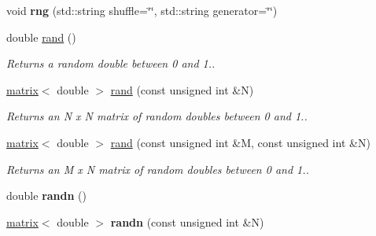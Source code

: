 \begin{DoxyCompactItemize}
\item 
\hypertarget{namespacekeycpp_af2478c69f713d8664b53d31f25718530}{void {\bfseries rng} (std\-::string shuffle=\char`\"{}\char`\"{}, std\-::string generator=\char`\"{}\char`\"{})}\label{namespacekeycpp_af2478c69f713d8664b53d31f25718530}

\item 
\hypertarget{namespacekeycpp_a5ef5c1f5951e8182a7c4ec9612f3f7e1}{double \hyperlink{namespacekeycpp_a5ef5c1f5951e8182a7c4ec9612f3f7e1}{rand} ()}\label{namespacekeycpp_a5ef5c1f5951e8182a7c4ec9612f3f7e1}

\begin{DoxyCompactList}\small\item\em Returns a random double between 0 and 1.. \end{DoxyCompactList}\item 
\hypertarget{namespacekeycpp_ab99a9561cf5654ae722a0879b41d9d73}{\hyperlink{classkeycpp_1_1matrix}{matrix}$<$ double $>$ \hyperlink{namespacekeycpp_ab99a9561cf5654ae722a0879b41d9d73}{rand} (const unsigned int \&N)}\label{namespacekeycpp_ab99a9561cf5654ae722a0879b41d9d73}

\begin{DoxyCompactList}\small\item\em Returns an N x N matrix of random doubles between 0 and 1.. \end{DoxyCompactList}\item 
\hypertarget{namespacekeycpp_af6413232f2de6f8ac96efde6531c3055}{\hyperlink{classkeycpp_1_1matrix}{matrix}$<$ double $>$ \hyperlink{namespacekeycpp_af6413232f2de6f8ac96efde6531c3055}{rand} (const unsigned int \&M, const unsigned int \&N)}\label{namespacekeycpp_af6413232f2de6f8ac96efde6531c3055}

\begin{DoxyCompactList}\small\item\em Returns an M x N matrix of random doubles between 0 and 1.. \end{DoxyCompactList}\item 
\hypertarget{namespacekeycpp_abbb4c27d8c550f3a522dcd4334986161}{double {\bfseries randn} ()}\label{namespacekeycpp_abbb4c27d8c550f3a522dcd4334986161}

\item 
\hypertarget{namespacekeycpp_ab55434470472a4b6c511e5a713a4d654}{\hyperlink{classkeycpp_1_1matrix}{matrix}$<$ double $>$ {\bfseries randn} (const unsigned int \&N)}\label{namespacekeycpp_ab55434470472a4b6c511e5a713a4d654}


\end{DoxyCompactItemize}
